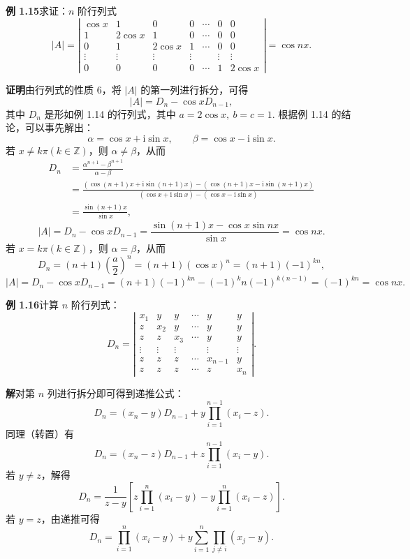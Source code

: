 \documentclass[UTF8, 12pt, fontset=fandol, oneside]{ctexart}
\begin{document}
\noindent\textbf{例 1.15}\quad 求证：$n$ 阶行列式
\[
|A|=\left|\begin{array}{ccccccc}
\cos x & 1 & 0 & 0 & \cdots & 0 & 0\\
1 & 2\cos x & 1 & 0 & \cdots & 0 & 0\\
0 & 1 & 2\cos x & 1 & \cdots & 0 & 0\\
\vdots & \vdots & \vdots & \vdots &        & \vdots & \vdots\\
0 & 0 & 0 & 0 & \cdots & 1 & 2\cos x
\end{array}\right|
=\cos nx.
\]

\noindent\textbf{证明}\quad 由行列式的性质 6，将 $|A|$ 的第一列进行拆分，可得
\[
|A|=D_n-\cos xD_{n-1},
\]
其中 $D_n$ 是形如例 1.14 的行列式，其中 $a=2\cos x,\ b=c=1$. 根据例 1.14 的结论，可以事先解出：
\[
\alpha=\cos x+\mathrm{i}\sin x,\qquad \beta=\cos x-\mathrm{i}\sin x.
\]
若 $x\ne k\pi(k\in\mathbb{Z})$，则 $\alpha\ne\beta$，从而
\[
\begin{aligned}
D_n
&=\frac{\alpha^{n+1}-\beta^{n+1}}{\alpha-\beta}\\
&=\frac{(\cos(n+1)x+\mathrm{i}\sin(n+1)x)-(\cos(n+1)x-\mathrm{i}\sin(n+1)x)}
{(\cos x+\mathrm{i}\sin x)-(\cos x-\mathrm{i}\sin x)}\\
&=\frac{\sin(n+1)x}{\sin x},
\end{aligned}
\]
\[
|A|=D_n-\cos xD_{n-1}
=\frac{\sin(n+1)x-\cos x\sin nx}{\sin x}
=\cos nx.
\]
若 $x=k\pi(k\in\mathbb{Z})$，则 $\alpha=\beta$，从而
\[
D_n=(n+1)\left(\frac a2\right)^n=(n+1)(\cos x)^n=(n+1)(-1)^{kn},
\]
\[
|A|=D_n-\cos xD_{n-1}
=(n+1)(-1)^{kn}-(-1)^k n(-1)^{k(n-1)}
=(-1)^{kn}=\cos nx.
\]

\noindent\textbf{例 1.16}\quad 计算 $n$ 阶行列式：
\[
D_n=\left|\begin{array}{cccccc}
x_1 & y & y & \cdots & y & y\\
z & x_2 & y & \cdots & y & y\\
z & z & x_3 & \cdots & y & y\\
\vdots & \vdots & \vdots &        & \vdots & \vdots\\
z & z & z & \cdots & x_{n-1} & y\\
z & z & z & \cdots & z & x_n
\end{array}\right|.
\]

\noindent\textbf{解}\quad 对第 $n$ 列进行拆分即可得到递推公式：
\[
D_n=(x_n-y)D_{n-1}+y\prod_{i=1}^{n-1}(x_i-z).
\]
同理（转置）有
\[
D_n=(x_n-z)D_{n-1}+z\prod_{i=1}^{n-1}(x_i-y).
\]
若 $y\ne z$，解得
\[
D_n=\frac1{z-y}\left[z\prod_{i=1}^n(x_i-y)-y\prod_{i=1}^n(x_i-z)\right].
\]
若 $y=z$，由递推可得
\[
D_n=\prod_{i=1}^n(x_i-y)+y\sum_{i=1}^n\prod_{j\ne i}(x_j-y).
\]
\end{document}
